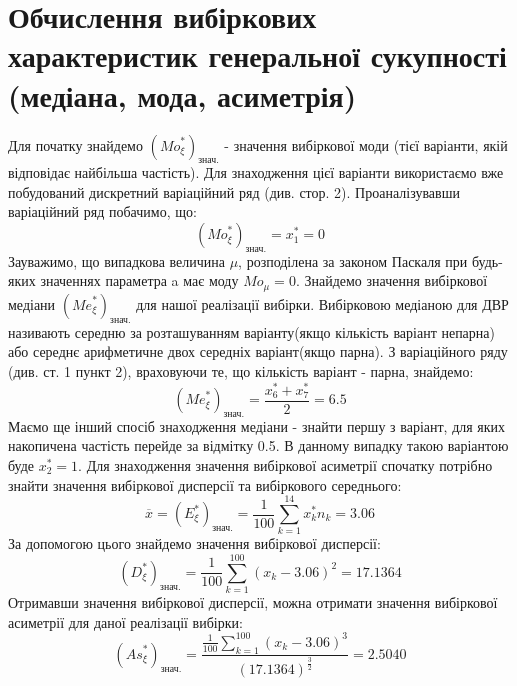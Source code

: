 \documentclass{article}
\begin{document}
\section{Обчислення вибіркових характеристик генеральної 
сукупності (медіана, мода, асиметрія)}
Для початку знайдемо $({Mo}_\xi^*)_{\text{знач.}}$ - 
значення вибіркової моди (тієї варіанти, якій відповідає 
найбільша частість). Для знаходження цієї варіанти використаємо
вже побудований дискретний варіаційний ряд (див. стор. 2).
Проаналізувавши варіаційний ряд побачимо, що:
$$({Mo}_\xi^*)_{\text{знач.}} = x_1^* = 0$$
Зауважимо, що випадкова величина $\mu$, розподілена за 
законом Паскаля при будь-яких значеннях параметра a
має моду ${Mo}_\mu = 0$.
\newline
\newline
Знайдемо значення вибіркової медіани $({Me}_\xi^*)_{\text{знач.}}$ 
для нашої реалізації вибірки. Вибірковою медіаною для ДВР називають 
середню за розташуванням варіанту(якщо кількість варіант непарна) 
або середнє арифметичне двох середніх варіант(якщо парна).
З варіаційного ряду (див. ст. 1 
пункт 2), враховуючи те, що кількість варіант - парна, 
знайдемо:$$ ({Me}_\xi^*)_{\text{знач.}} = \frac{x_6^* + x_7^*}
{2} = 6.5 $$
Маємо ще інший спосіб знаходження медіани - знайти першу з варіант, 
для яких накопичена частість перейде за відмітку 0.5. В данному випадку 
такою варіантою буде $x_2^* = 1.$
\newline
Для знаходження значення вибіркової асиметрії спочатку потрібно 
знайти значення вибіркової дисперсії та вибіркового середнього: 
$$\overline{x} = (E^*_{\xi})_{\text{знач.}} = \frac{1}{100} 
\sum_{k = 1}^{14} x_k^* n_k = 3.06$$
За допомогою цього знайдемо значення вибіркової дисперсії:
$$(D^*_{\xi})_{\text{знач.}} = \frac{1}{100} \sum_{k = 1}^{100}
(x_k - 3.06)^2 = 17.1364$$
Отримавши значення вибіркової дисперсії, можна отримати значення
вибіркової асиметрії для даної реалізації вибірки:
$$({As}_{\xi}^*)_{\text{знач.}} = \frac{\frac{1}{100}
\sum_{k = 1}^{100}(x_k - 3.06)^3}{(17.1364)^
{\frac{3}{2}}} = 2.5040$$
\end{document}
